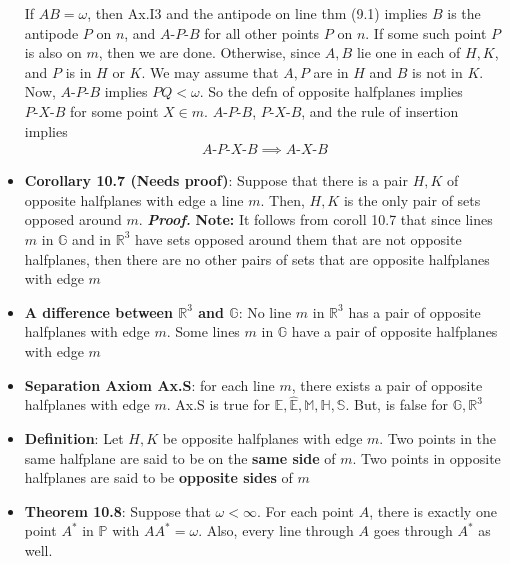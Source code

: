 \documentclass{report}
\begin{document}
\begin{itemize}
            \bigbreak \noindent 
            If $AB = \omega$, then Ax.I3 and the antipode on line thm (9.1) implies $B$ is the antipode $P$ on $n$, and $ A\text{-}P\text{-}B$ for all other points $P$  on $n$. If some  such point $P$ is also on $m$, then we are done. Otherwise, since $A,B$ lie one in each of $H,K$, and $P$ is in $H$ or $K$. We may assume that $A,P$ are in $H$ and $B$ is not in $K$.
            \bigbreak \noindent 
            Now, $ A\text{-}P\text{-}B$ implies $PQ < \omega$. So the defn of opposite halfplanes implies $ P\text{-}X\text{-}B$ for some point $X \in m$. $ A\text{-}P\text{-}B$, $ P\text{-}X\text{-}B$, and the rule of insertion implies
            \begin{align*}
                A\text{-}P\text{-}X\text{-}B \implies A\text{-}X\text{-}B
            \end{align*}
        \item \textbf{Corollary 10.7 (Needs proof)}: Suppose that there is a pair $H,K$ of opposite halfplanes with edge a line $m$. Then, $H,K$ is the only pair of sets opposed around $m$.
            \bigbreak \noindent 
            \textbf{\textit{Proof.}}
            \bigbreak \noindent 
            \textbf{Note:} It follows from coroll 10.7 that since lines $m$ in $\mathbb{G}$ and in $\mathbb{R}^{3}$ have sets opposed around them that are not opposite halfplanes, then there are no other pairs of sets that are opposite halfplanes with edge $m$
        \item \textbf{A difference between $\mathbb{R}^{3}$ and $\mathbb{G}$}: No line $m$ in $\mathbb{R}^{3}$ has a pair of opposite halfplanes with edge $m$. Some lines $m$ in $\mathbb{G}$ have a pair of opposite halfplanes with edge $m$
        \item \textbf{Separation Axiom Ax.S}: for each line $m$, there exists a pair of opposite halfplanes with edge $m$. 
            \bigbreak \noindent 
            Ax.S is true for $\mathbb{E}, \hat{\mathbb{E}}, \mathbb{M},\mathbb{H}, \mathbb{S}$. But, is false for $\mathbb{G}, \mathbb{R}^{3}$
        \item \textbf{Definition}: Let $H,K$ be opposite halfplanes with edge $m$. Two points in the same halfplane are said to be on the \textbf{same side} of $m$. 
            \bigbreak \noindent 
            Two points in opposite halfplanes are said to be \textbf{opposite sides} of $m$
        \item \textbf{Theorem 10.8}: Suppose that $\omega < \infty$. For each point $ A$, there is exactly one point $A^{*}$ in $\mathbb{P}$ with $AA^{*} = \omega$. Also, every line through $A$ goes through $A^{*}$ as well.

\end{itemize}
\end{document}
